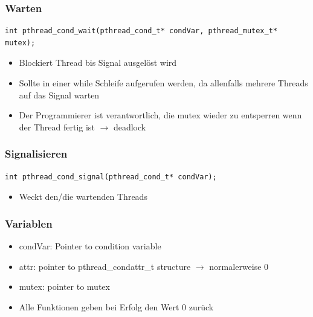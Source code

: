 \begin{minipage}{0.6\linewidth}
    \subsubsection{Warten}
    \begin{lstlisting}[style=cpp]
    int pthread_cond_wait(pthread_cond_t* condVar, pthread_mutex_t* mutex);
    \end{lstlisting}
    \begin{itemize}
        \item Blockiert Thread bis Signal ausgelöst wird
        \item Sollte in einer while Schleife aufgerufen werden, da allenfalls mehrere Threads auf das Signal warten
        \item Der Programmierer ist verantwortlich, die mutex wieder zu entsperren wenn der Thread fertig ist $\rightarrow$ deadlock
    \end{itemize}
\end{minipage}
\hspace{0.5cm}
\begin{minipage}{0.35\linewidth}
    \subsubsection{Signalisieren}
    \begin{lstlisting}[style=cpp]
    int pthread_cond_signal(pthread_cond_t* condVar);
    \end{lstlisting}
    \begin{itemize}
        \item Weckt den/die wartenden Threads
    \end{itemize}
\end{minipage}

\subsubsection{Variablen}
\begin{itemize}
    \item condVar: Pointer to condition variable
    \item attr: pointer to pthread\_condattr\_t structure $\rightarrow$ normalerweise 0
    \item mutex: pointer to mutex
    \item Alle Funktionen geben bei Erfolg den Wert 0 zurück
\end{itemize}

